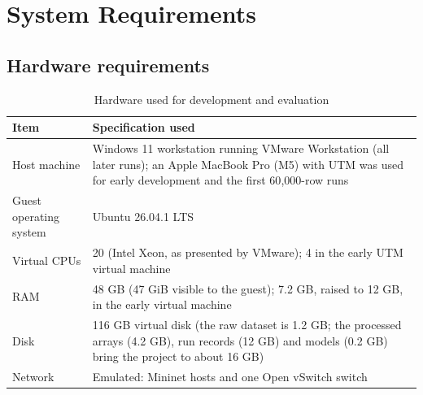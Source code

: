 \section{System Requirements}
\subsection{Hardware requirements}\label{sec:hw}
\begin{table}[H]
\centering
\renewcommand{\arraystretch}{1.25}
\begin{tabular}{|p{4cm}|p{9.5cm}|}
\hline
\textbf{Item} & \textbf{Specification used} \\ \hline
Host machine & Windows 11 workstation running VMware Workstation (all later runs); an Apple MacBook Pro (M5) with UTM was used for early development and the first 60{,}000-row runs \\ \hline
Guest operating system & Ubuntu 26.04.1 LTS \\ \hline
Virtual CPUs & 20 (Intel Xeon, as presented by VMware); 4 in the early UTM virtual machine \\ \hline
RAM & 48 GB (47 GiB visible to the guest); 7.2 GB, raised to 12 GB, in the early virtual machine \\ \hline
Disk & 116 GB virtual disk (the raw dataset is 1.2 GB; the processed arrays (4.2 GB), run records (12 GB) and models (0.2 GB) bring the project to about 16 GB) \\ \hline
Network & Emulated: Mininet hosts and one Open vSwitch switch \\ \hline
\end{tabular}
\caption{Hardware used for development and evaluation}
\label{tab:hw}
\end{table}

